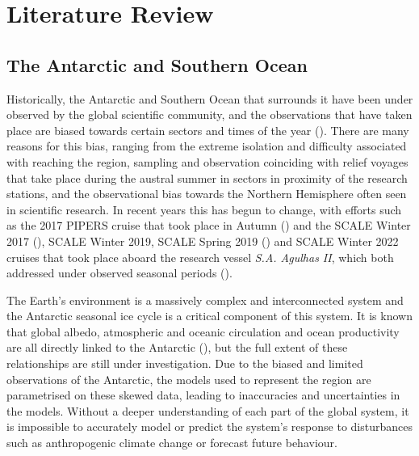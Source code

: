 \chapter{Literature Review}
\label{ch:lit_review}

\section{The Antarctic and Southern Ocean}
\label{sec:ch2.section1}

Historically, the Antarctic and Southern Ocean that surrounds it have been under observed by the global scientific community, and the observations that have taken place are biased towards certain sectors and times of the year (\cite{kennicuttSustainedAntarcticResearch2019}). There are many reasons for this bias, ranging from the extreme isolation and difficulty associated with reaching the region, sampling and observation coinciding with relief voyages that take place during the austral summer in sectors in proximity of the research stations, and the observational bias towards the Northern Hemisphere often seen in scientific research. In recent years this has begun to change, with efforts such as the 2017 \ac{PIPERS} cruise that took place in Autumn (\cite{ackleySeaiceProductionAir2020}) and the \ac{SCALE} Winter 2017 (\cite{vichiCruiseReportTrack2018}), \ac{SCALE} Winter 2019, \ac{SCALE} Spring 2019 (\cite{ryan-keoghSCALEWIN19SCALESPR19Cruise2022}) and \ac{SCALE} Winter 2022 cruises that took place aboard the research vessel \textit{S.A. Agulhas II}, which both addressed under observed seasonal periods (\cite{vichiIndicatorSeaIce2022}).

The Earth's environment is a massively complex and interconnected system and the Antarctic seasonal ice cycle is a critical component of this system. It is known that global albedo, atmospheric and oceanic circulation and ocean productivity are all directly linked to the Antarctic (\cite{eayrsUnderstandingSeasonalCycle2019}), but the full extent of these relationships are still under investigation. Due to the biased and limited observations of the Antarctic, the models used to represent the region are parametrised on these skewed data, leading to inaccuracies and uncertainties in the models. Without a deeper understanding of each part of the global system, it is impossible to accurately model or predict the system's response to disturbances such as anthropogenic climate change or forecast future behaviour.

